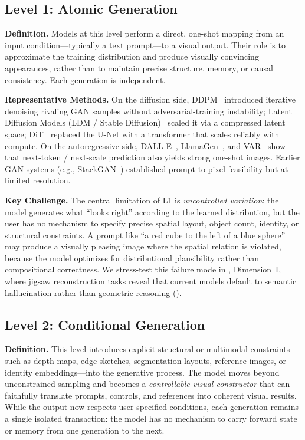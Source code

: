 \documentclass{llmxive}
\begin{document}
\subsection{Level 1: Atomic Generation}
\label{subsec:level1}

\textbf{Definition.} Models at this level perform a direct, one-shot mapping from an input condition---typically a text prompt---to a visual output. Their role is to approximate the training distribution and produce visually convincing appearances, rather than to maintain precise structure, memory, or causal consistency. Each generation is independent.

\textbf{Representative Methods.} On the diffusion side, DDPM~\citep{ho2020denoising} introduced iterative denoising rivaling GAN samples without adversarial-training instability; Latent Diffusion Models (LDM / Stable Diffusion)~\citep{rombach2022stablediffusion} scaled it via a compressed latent space; DiT~\citep{peebles2023scalable} replaced the U-Net with a transformer that scales reliably with compute. On the autoregressive side, DALL-E~\citep{ramesh2021zero}, LlamaGen~\citep{sun2024autoregressive}, and VAR~\citep{tian2024visual} show that next-token / next-scale prediction also yields strong one-shot images. Earlier GAN systems (e.g., StackGAN~\citep{zhang2017stackgan}) established prompt-to-pixel feasibility but at limited resolution.

\textbf{Key Challenge.} The central limitation of L1 is \emph{uncontrolled variation}: the model generates what ``looks right'' according to the learned distribution, but the user has no mechanism to specify precise spatial layout, object count, identity, or structural constraints. A prompt like ``a red cube to the left of a blue sphere'' may produce a visually pleasing image where the spatial relation is violated, because the model optimizes for distributional plausibility rather than compositional correctness. We stress-test this failure mode in , Dimension~I, where jigsaw reconstruction tasks reveal that current models default to semantic hallucination rather than geometric reasoning ().


\subsection{Level 2: Conditional Generation}
\label{subsec:level2}

\textbf{Definition.} This level introduces explicit structural or multimodal constraints---such as depth maps, edge sketches, segmentation layouts, reference images, or identity embeddings---into the generative process. The model moves beyond unconstrained sampling and becomes a \emph{controllable visual constructor} that can faithfully translate prompts, controls, and references into coherent visual results. While the output now respects user-specified conditions, each generation remains a single isolated transaction: the model has no mechanism to carry forward state or memory from one generation to the next.
\end{document}
